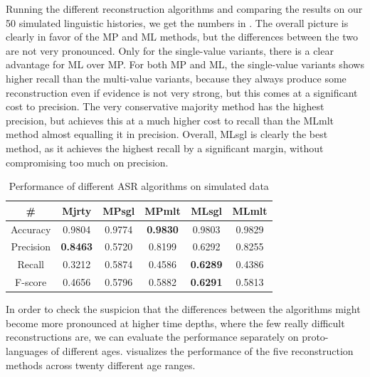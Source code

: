 Running the different reconstruction algorithms and comparing the results on our 50 simulated linguistic histories, we get the numbers in . The overall picture is clearly in favor of the MP and ML methods, but the differences between the two are not very pronounced. Only for the single-value variants, there is a clear advantage for ML over MP. For both MP and ML, the single-value variants shows higher recall than the multi-value variants, because they always produce some reconstruction even if evidence is not very strong, but this comes at a significant cost to precision. The very conservative majority method has the highest precision, but achieves this at a much higher cost to recall than the MLmlt method almost equalling it in precision. Overall, MLsgl is clearly the best method, as it achieves the highest recall by a significant margin, without compromising too much on precision.

\begin{table}
 \centering
 \begin{tabular}{cccccc}
  \hline \hline
  \# & Mjrty & MPsgl & MPmlt & MLsgl & MLmlt\\ \hline
  Accuracy & 0.9804 & 0.9774 & \textbf{0.9830} & 0.9803 & 0.9829\\
  Precision & \textbf{0.8463} & 0.5720 & 0.8199 & 0.6292 & 0.8255\\
  Recall & 0.3212 & 0.5874 & 0.4586 & \textbf{0.6289} & 0.4386\\
  F-score & 0.4656 & 0.5796 & 0.5882 & \textbf{0.6291} & 0.5813\\
  \hline
 \end{tabular}
 \caption{Performance of different ASR algorithms on simulated data}
 \label{asr-overall-results}
\end{table}

In order to check the suspicion that the differences between the algorithms might become more pronounced at higher time depths, where the few really difficult reconstructions are, we can evaluate the performance separately on proto-languages of different ages.  visualizes the performance of the five reconstruction methods across twenty different age ranges.

